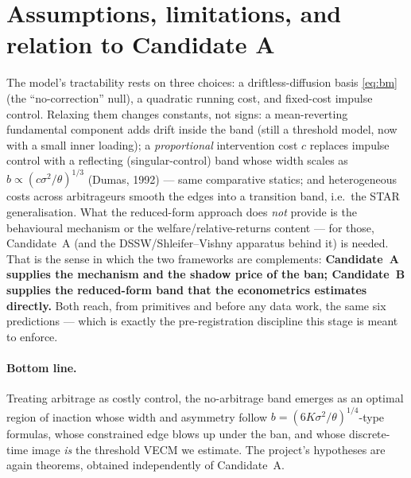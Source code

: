 \documentclass[11pt,a4paper]{article}
\theoremstyle{plain}
\theoremstyle{definition}
\theoremstyle{remark}
\begin{document}
\section{Assumptions, limitations, and relation to Candidate A}
The model's tractability rests on three choices: a driftless-diffusion basis \eqref{eq:bm} (the ``no-correction'' null), a quadratic running cost, and fixed-cost impulse control. Relaxing them changes constants, not signs: a mean-reverting fundamental component adds drift inside the band (still a threshold model, now with a small inner loading); a \emph{proportional} intervention cost $c$ replaces impulse control with a reflecting (singular-control) band whose width scales as $b\propto(c\sigma^2/\theta)^{1/3}$ (Dumas, 1992) --- same comparative statics; and heterogeneous costs across arbitrageurs smooth the edges into a transition band, i.e.\ the STAR generalisation. What the reduced-form approach does \emph{not} provide is the behavioural mechanism or the welfare/relative-returns content --- for those, Candidate~A (and the DSSW/Shleifer--Vishny apparatus behind it) is needed. That is the sense in which the two frameworks are complements: \textbf{Candidate~A supplies the mechanism and the shadow price of the ban; Candidate~B supplies the reduced-form band that the econometrics estimates directly.} Both reach, from primitives and before any data work, the same six predictions --- which is exactly the pre-registration discipline this stage is meant to enforce.

\paragraph{Bottom line.} Treating arbitrage as costly control, the no-arbitrage band emerges as an optimal region of inaction whose width and asymmetry follow $b=(6K\sigma^2/\theta)^{1/4}$-type formulas, whose constrained edge blows up under the ban, and whose discrete-time image \emph{is} the threshold VECM we estimate. The project's hypotheses are again theorems, obtained independently of Candidate~A.
\end{document}
